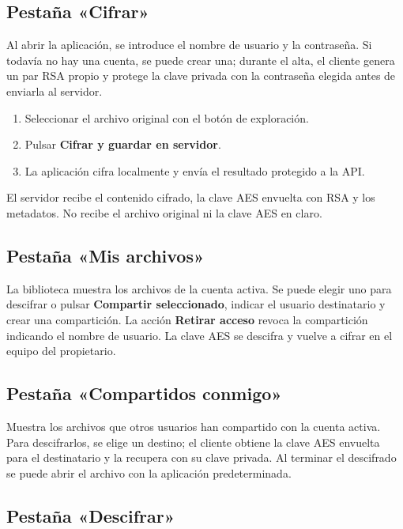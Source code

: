 \documentclass[12pt,a4paper]{article}
\begin{document}
\subsection{Pestaña «Cifrar»}

Al abrir la aplicación, se introduce el nombre de usuario y la contraseña. Si todavía no hay una cuenta, se puede crear una; durante el alta, el cliente genera un par RSA propio y protege la clave privada con la contraseña elegida antes de enviarla al servidor.

\begin{enumerate}
    \item Seleccionar el archivo original con el botón de exploración.
    \item Pulsar \textbf{Cifrar y guardar en servidor}.
    \item La aplicación cifra localmente y envía el resultado protegido a la API.
\end{enumerate}

El servidor recibe el contenido cifrado, la clave AES envuelta con RSA y los metadatos. No recibe el archivo original ni la clave AES en claro.

\subsection{Pestaña «Mis archivos»}

La biblioteca muestra los archivos de la cuenta activa. Se puede elegir uno para descifrar o pulsar \textbf{Compartir seleccionado}, indicar el usuario destinatario y crear una compartición. La acción \textbf{Retirar acceso} revoca la compartición indicando el nombre de usuario. La clave AES se descifra y vuelve a cifrar en el equipo del propietario.

\subsection{Pestaña «Compartidos conmigo»}

Muestra los archivos que otros usuarios han compartido con la cuenta activa. Para descifrarlos, se elige un destino; el cliente obtiene la clave AES envuelta para el destinatario y la recupera con su clave privada. Al terminar el descifrado se puede abrir el archivo con la aplicación predeterminada.

\subsection{Pestaña «Descifrar»}
\end{document}
